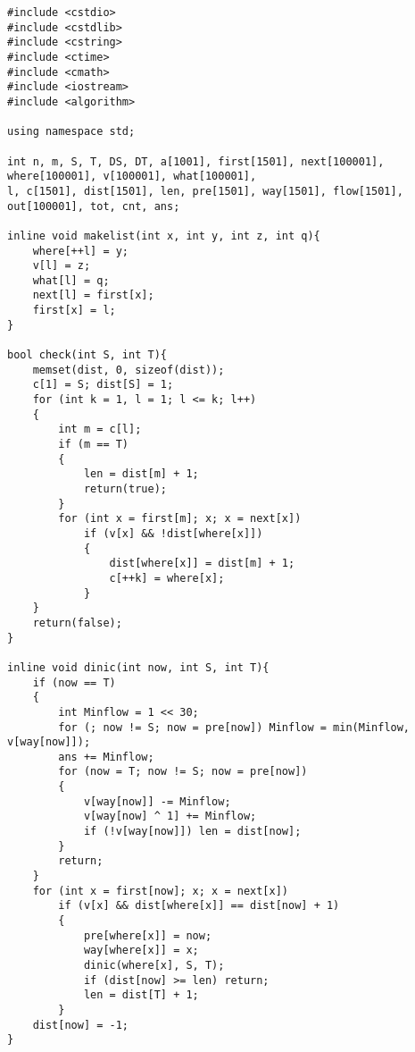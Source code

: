 \begin{lstlisting}
#include <cstdio>
#include <cstdlib>
#include <cstring>
#include <ctime>
#include <cmath>
#include <iostream>
#include <algorithm>

using namespace std;

int n, m, S, T, DS, DT, a[1001], first[1501], next[100001], where[100001], v[100001], what[100001],
l, c[1501], dist[1501], len, pre[1501], way[1501], flow[1501], out[100001], tot, cnt, ans;

inline void makelist(int x, int y, int z, int q){
    where[++l] = y;
    v[l] = z;
    what[l] = q;
    next[l] = first[x];
    first[x] = l;
}

bool check(int S, int T){
    memset(dist, 0, sizeof(dist));
    c[1] = S; dist[S] = 1;
    for (int k = 1, l = 1; l <= k; l++)
    {
        int m = c[l];
        if (m == T)
        {
            len = dist[m] + 1;
            return(true);
        }
        for (int x = first[m]; x; x = next[x])
            if (v[x] && !dist[where[x]])
            {
                dist[where[x]] = dist[m] + 1; 
                c[++k] = where[x];
            }
    }
    return(false);
}

inline void dinic(int now, int S, int T){
    if (now == T)
    {
        int Minflow = 1 << 30;
        for (; now != S; now = pre[now]) Minflow = min(Minflow, v[way[now]]);
        ans += Minflow;
        for (now = T; now != S; now = pre[now]) 
        {
            v[way[now]] -= Minflow;
            v[way[now] ^ 1] += Minflow;
            if (!v[way[now]]) len = dist[now];
        }
        return;
    }
    for (int x = first[now]; x; x = next[x])
        if (v[x] && dist[where[x]] == dist[now] + 1)
        {
            pre[where[x]] = now;
            way[where[x]] = x;
            dinic(where[x], S, T);
            if (dist[now] >= len) return;
            len = dist[T] + 1;
        }
    dist[now] = -1;
}


\end{lstlisting}

